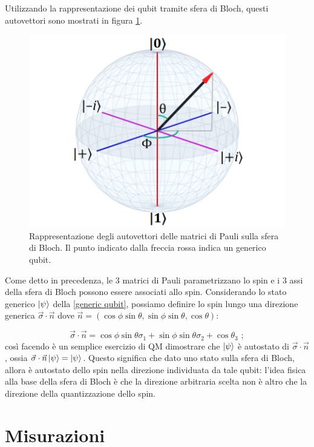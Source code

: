 \noindent Utilizzando la rappresentazione dei qubit tramite sfera di Bloch, questi autovettori sono mostrati in figura \ref{fig:BlochSphere2}. 

\begin{figure}[!ht]
    \centering
    \includegraphics[scale=0.6]{images/bloch-hdr-440.png}
    \caption{Rappresentazione degli autovettori delle matrici di Pauli sulla sfera di Bloch. Il punto indicato dalla freccia rossa indica un generico qubit.}
    \label{fig:BlochSphere2}
\end{figure}

\noindent Come detto in precedenza, le 3 matrici di Pauli parametrizzano lo spin e i 3 assi della sfera di Bloch possono essere associati allo spin. Considerando lo stato generico $\ket{\psi}$ della \eqref{generic qubit}, possiamo definire lo spin lungo una direzione generica $\vec{\sigma} \cdot \vec{n}$ dove $\vec n = (\cos\phi\sin\theta, \sin\phi\sin\theta, \cos\theta)$:

\begin{equation*}
    \vec{\sigma} \cdot \vec n = \cos\phi\sin\theta \sigma_1 + \sin \phi \sin \theta \sigma_2 + \cos \theta_3 \, \, ;
\end{equation*}
così facendo è un semplice esercizio di QM dimostrare che $\ket{\psi}$ è autostato di $\vec{\sigma} \cdot \vec n$, ossia $\vec{\sigma} \cdot \vec n \ket{\psi} = \ket{\psi}$. Questo significa che dato uno stato sulla sfera di Bloch, allora è autostato dello spin nella direzione individuata da tale qubit: l'idea fisica alla base della sfera di Bloch è che la direzione arbitraria scelta non è altro che la direzione della quantizzazione dello spin. 

\section{Misurazioni}

